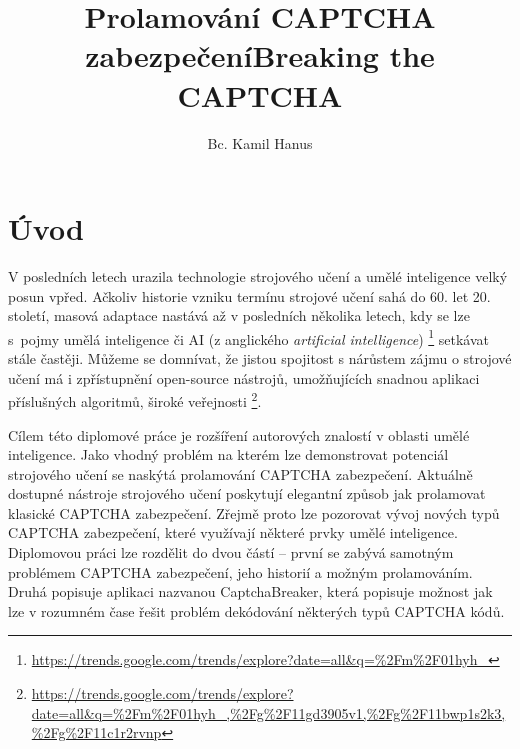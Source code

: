 \documentclass[
  field=ainfp,
  master=true,
  biblatex,
  sourcecodes=false,
  theorems=false,
  glossaries,
  index
]{kidiplom}
\title{Prolamování CAPTCHA zabezpečení}
\title[english]{Breaking the CAPTCHA}
\author{Bc. Kamil Hanus}
\begin{document}
\maketitle



\newcommand{\BibLaTeX}{\textsc{Bib}\LaTeX}
\renewcommand\UrlFont{}



\section{Úvod}
V posledních letech urazila technologie strojového učení a umělé inteligence velký posun vpřed. Ačkoliv historie vzniku termínu strojové učení sahá do  60. let 20. století, masová adaptace nastává až v posledních několika letech, kdy se lze s~pojmy umělá inteligence či AI (z anglického \textit{artificial intelligence}) \footnote{\url{https://trends.google.com/trends/explore?date=all\&q=\%2Fm\%2F01hyh\_}} setkávat stále častěji. Můžeme se domnívat, že jistou spojitost s nárůstem zájmu o strojové učení má i zpřístupnění open-source nástrojů, umožňujících snadnou aplikaci příslušných algoritmů, široké veřejnosti \footnote{\url{https://trends.google.com/trends/explore?date=all\&q=\%2Fm\%2F01hyh\_,\%2Fg\%2F11gd3905v1,\%2Fg\%2F11bwp1s2k3,\%2Fg\%2F11c1r2rvnp}}.

Cílem této diplomové práce je  rozšíření autorových znalostí v oblasti umělé inteligence. Jako vhodný problém na kterém lze demonstrovat potenciál strojového učení se naskýtá prolamování CAPTCHA zabezpečení. Aktuálně dostupné nástroje strojového učení poskytují elegantní způsob jak prolamovat klasické CAPTCHA zabezpečení. Zřejmě proto lze pozorovat vývoj nových typů CAPTCHA zabezpečení, které využívají některé prvky umělé inteligence. Diplomovou práci lze rozdělit do dvou částí -- první se zabývá samotným problémem CAPTCHA zabezpečení, jeho historií a možným prolamováním. Druhá popisuje aplikaci nazvanou CaptchaBreaker, která popisuje možnost jak lze v rozumném čase řešit problém dekódování některých typů CAPTCHA kódů.
\newpage
\end{document}
